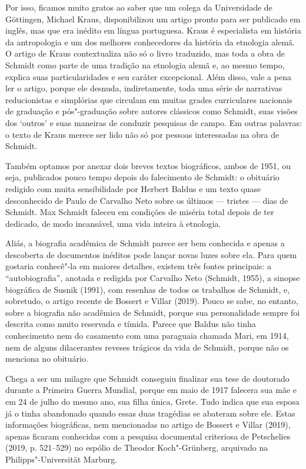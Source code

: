 Por isso, ficamos muito gratos ao saber que um colega da Universidade de
Göttingen, Michael Kraus, disponibilizou um artigo pronto para ser
publicado em inglês, mas que era inédito em língua portuguesa. Kraus é
especialista em história da antropologia e um dos melhores conhecedores
da história da etnologia alemã. O artigo de Kraus contextualiza não só o
livro traduzido, mas toda a obra de Schmidt como parte de uma tradição
na etnologia alemã e, ao mesmo tempo, explica suas particularidades e
seu caráter excepcional. Além disso, vale a pena ler o artigo, porque
ele desnuda, indiretamente, toda uma série de narrativas reducionistas e
simplórias que circulam em muitas grades curriculares nacionais de
graduação e pós"-graduação sobre autores clássicos como Schmidt, suas
visões dos `outros' e suas maneiras de conduzir pesquisas de campo. Em
outras palavras: o texto de Kraus merece ser lido não só por pessoas
interessadas na obra de Schmidt.

Também optamos por anexar dois breves textos biográficos, ambos de
1951, ou seja, publicados pouco tempo depois do falecimento de Schmidt:
o obituário redigido com muita sensibilidade por Herbert Baldus e um
texto quase desconhecido de Paulo de Carvalho Neto sobre os últimos ---
tristes --- dias de Schmidt. Max Schmidt faleceu em condições de miséria
total depois de ter dedicado, de modo incansável, uma vida inteira à
etnologia.

Aliás, a biografia acadêmica de Schmidt parece ser bem conhecida e
apenas a descoberta de documentos inéditos pode lançar novas luzes sobre
ela. Para quem gostaria conhecê"-la em maiores detalhes, existem três
fontes principais: a ``autobiografia'', anotada e redigida por Carvalho
Neto (Schmidt, 1955), a sinopse biográfica de Susnik (1991), com
resenhas de todos os trabalhos de Schmidt, e, sobretudo, o artigo
recente de Bossert e Villar (2019). Pouco se sabe, no entanto, sobre a
biografia não acadêmica de Schmidt, porque sua personalidade sempre foi
descrita como muito reservada e tímida. Parece que Baldus não tinha
conhecimento nem do casamento com uma paraguaia chamada Mari, em 1914,
nem de alguns dilacerantes reveses trágicos da vida de Schmidt, porque
não os menciona no obituário.

Chega a ser um milagre que Schmidt conseguiu finalizar sua tese de
doutorado durante a Primeira Guerra Mundial, porque em maio de 1917
falecera sua mãe e em 24 de julho do mesmo ano, sua filha única, Grete.
Tudo indica que sua esposa já o tinha abandonado quando essas duas
tragédias se abateram sobre ele. Estas informações biográficas, nem
mencionadas no artigo de Bossert e Villar (2019), apenas ficaram
conhecidas com a pesquisa documental criteriosa de Petschelies (2019, p.
521--529) no espólio de Theodor Koch"-Grünberg, arquivado na
Philipps"-Universität Marburg.

